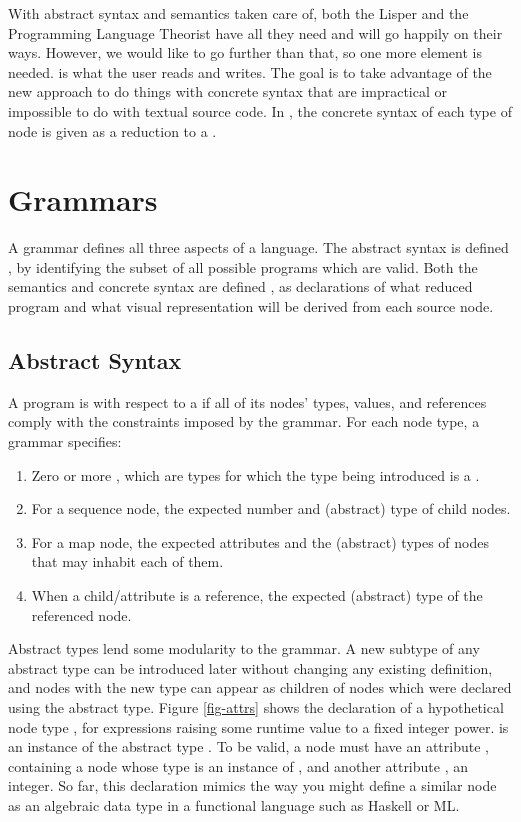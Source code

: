 With abstract syntax and semantics taken care of, both the Lisper and the Programming Language Theorist have all they need and will go happily on their ways. However, we would like to go further than that, so one more element is needed.  is what the user reads and writes. The goal is to take advantage of the new approach to do things with concrete syntax that are impractical or impossible to do with textual source code. In \Meta, the concrete syntax of each type of node is given as a reduction to a .

%
%
\section{Grammars}
\label{grammars}
A grammar defines all three aspects of a language. The abstract syntax is defined , by identifying the subset of all possible programs which are valid. Both the semantics and concrete syntax are defined , as declarations of what reduced program and what visual representation will be derived from each source node.

\subsection{Abstract Syntax}
A program is  with respect to a  if all of its nodes' types, values, and references comply with the constraints imposed by the grammar. For each node type, a grammar specifies:
\begin{enumerate}
\item Zero or more , which are types for which the type being introduced is a .
\item For a sequence node, the expected number and (abstract) type of child nodes.
\item For a map node, the expected attributes and the (abstract) types of nodes that may inhabit each of them.
\item When a child/attribute is a reference, the expected (abstract) type of the referenced node.
\end{enumerate}

Abstract types lend some modularity to the grammar. A new subtype of any abstract type can be introduced later without changing any existing definition, and nodes with the new type can appear as children of nodes which were declared using the abstract type. Figure \ref{fig-attrs} shows the declaration of a hypothetical node type , for expressions raising some runtime value to a fixed integer power.  is an instance of the abstract type . To be valid, a  node must have an attribute , containing a node whose type is an instance of , and another attribute , an integer. So far, this declaration mimics the way you might define a similar node as an algebraic data type in a functional language such as Haskell or ML.

